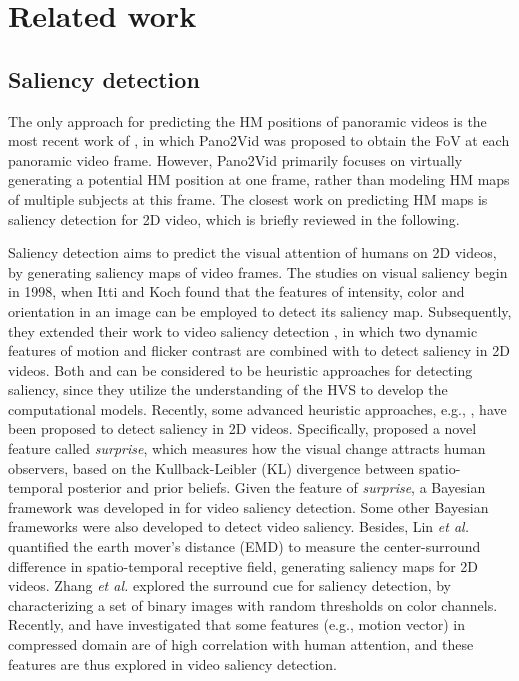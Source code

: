 \documentclass[10pt,journal,compsoc]{IEEEtran}
\begin{document}
\section{Related work}

\subsection{Saliency detection}
The only approach for predicting the HM positions of panoramic videos is the most recent work of \cite{su2016pano2vid}, in which Pano2Vid was proposed to obtain the FoV at each panoramic video frame. However, Pano2Vid primarily focuses on virtually generating a potential HM position at one frame, rather than modeling HM maps of multiple subjects at this frame. The closest work on predicting HM maps is saliency detection for 2D video, which is briefly reviewed in the following.

Saliency detection aims to predict the visual attention of humans on 2D videos, by generating saliency maps of video frames. The studies on visual saliency begin in 1998, when Itti and Koch \cite{itti1998model} found that the features of intensity, color and orientation in an image can be employed to detect its saliency map. Subsequently, they extended their work to video saliency detection \cite{itti2004automatic}, in which two dynamic features of motion and flicker contrast are combined with \cite{itti1998model} to detect saliency in 2D videos. Both \cite{itti1998model} and \cite{itti2004automatic} can be considered to be heuristic approaches for detecting saliency, since they utilize the understanding of the HVS to develop the computational models. Recently, some advanced heuristic approaches, e.g.,  \cite{itti2009bayesian, boccignone2008nonparametric, zhang2009sunday, guo2010novel, ren2013regularized, lin2013visual, zhang2016exploiting, hossein2015many, xu2017learning}, have been proposed to detect saliency in 2D videos. Specifically, \cite{itti2009bayesian} proposed a novel feature called \textit{surprise}, which measures how the visual change attracts human observers, based on the Kullback-Leibler (KL) divergence between spatio-temporal posterior and prior beliefs. Given the feature of \textit{surprise}, a Bayesian framework was developed in \cite{itti2009bayesian} for video saliency detection.  Some other Bayesian frameworks \cite{boccignone2008nonparametric, zhang2009sunday}  were also developed to detect video saliency. Besides, Lin \textit{et al.} \cite{lin2013visual} quantified the earth mover's distance (EMD) to measure the center-surround difference in spatio-temporal receptive field, generating saliency maps for 2D videos. Zhang \textit{et al.} \cite{zhang2016exploiting} explored the surround cue for saliency detection, by characterizing a set of binary images with random thresholds on color channels. Recently, \cite{hossein2015many} and \cite{xu2017learning} have investigated that some features (e.g., motion vector) in compressed domain are of high correlation with human attention, and these features are thus explored in video saliency detection.
\end{document}
